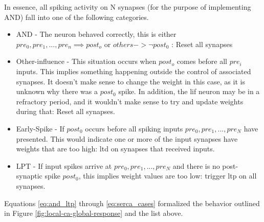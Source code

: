 


In essence, all spiking activity on N synapses (for the purpose of implementing
AND) fall into one of the following categories.
\begin{itemize}
\item AND - The neuron behaved correctly, this is either $pre_0, pre_1, ...,
  pre_n \implies post_o$ or $others -> \neg post_0$ : Reset all synapses
\item Other-influence - This situation occurs when $post_o$ comes before all
  $pre_i$ inputs. This implies something happening outside the control of
  associated synapses. It doesn't make sense to change the weight in this case,
  as it is unknown why there was a $post_0$ spike. In addition, the \Gls{lif} neuron
  may be in a refractory period, and it wouldn't make sense to try and update
  weights during that: Reset all synapses.
\item Early-Spike - If $post_0$ occurs before all spiking inputs $pre_0, pre_1,
  ..., pre_N$ have presented. This would indicate one or more of the input
  synapses have weights that are too high: \Gls{ltd} on synapses that received inputs.
\item LPT - If input spikes arrive at $pre_0, pre_1, ..., pre_N$ and there is no
  post-synaptic spike $post_0$, this implies weight values are too low: trigger
  \Gls{ltp} on all synapses.
\end{itemize}

Equations \ref{eq:and_ltp} through \ref{eq:serca_cases} formalized the behavior outlined
in Figure \ref{fig:local-ca-global-response} and the list above.

